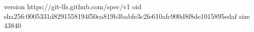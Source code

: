 version https://git-lfs.github.com/spec/v1
oid sha256:0005331d8291558194f50ea819b3babfe3c2fe610afc900d8f8de1015895edaf
size 43840
